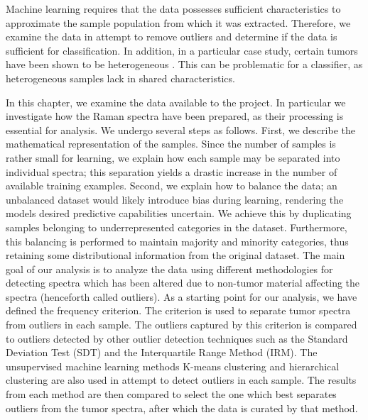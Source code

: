 Machine learning requires that the data possesses sufficient characteristics to approximate the sample population from which it was extracted. Therefore, we examine the data in attempt to remove outliers and determine if the data is sufficient for classification. In addition, in a particular case study, certain tumors have been shown to be heterogeneous \cite{friedmann2014glioblastoma}. This can be problematic for a classifier, as heterogeneous samples lack in shared characteristics. 

In this chapter, we examine the data available to the project. In particular we investigate how the Raman spectra have been prepared, as their processing is essential for analysis. We undergo several steps as follows. First, we describe the mathematical representation of the samples. Since the number of samples is rather small for learning, we explain how each sample may be separated into individual spectra; this separation yields a drastic increase in the number of available training examples. Second, we explain how to balance the data; an unbalanced dataset would likely introduce bias during learning, rendering the models desired predictive capabilities uncertain. We achieve this by duplicating samples belonging to underrepresented categories in the dataset. Furthermore, this balancing is performed to maintain majority and minority categories, thus retaining some distributional information from the original dataset. The main goal of our analysis is to analyze the data using different methodologies for detecting spectra which has been altered due to non-tumor material affecting the spectra (henceforth called outliers). As a starting point for our analysis, we have defined the frequency criterion. The criterion is used to separate tumor spectra from outliers in each sample. The outliers captured by this criterion is compared to outliers detected by other outlier detection techniques such as the Standard Deviation Test (SDT) and the Interquartile Range Method (IRM). The unsupervised machine learning methods K-means clustering and hierarchical clustering are also used in attempt to detect outliers in each sample. The results from each method are then compared to select the one which best separates outliers from the tumor spectra, after which the data is curated by that method.

